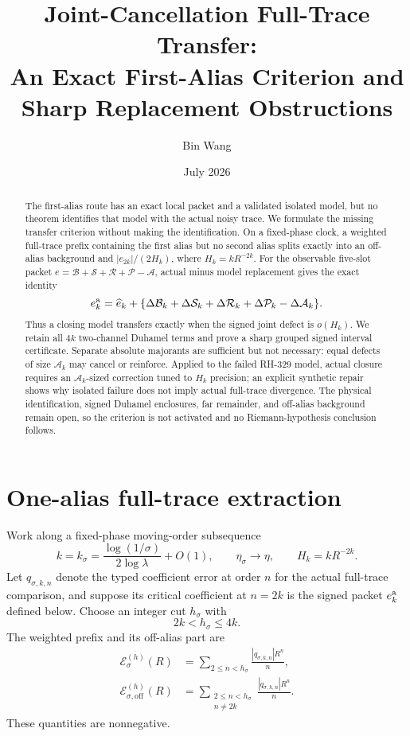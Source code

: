\documentclass[11pt]{article}
\title{Joint-Cancellation Full-Trace Transfer:\\
An Exact First-Alias Criterion and Sharp Replacement Obstructions}
\author{Bin Wang}
\date{July 2026}
\theoremstyle{remark}
\newcommand{\cA}{\mathcal A}
\newcommand{\cB}{\mathcal B}
\newcommand{\cE}{\mathcal E}
\newcommand{\cP}{\mathcal P}
\newcommand{\cR}{\mathcal R}
\newcommand{\cS}{\mathcal S}
\begin{document}
\maketitle

\begin{abstract}
The first-alias route has an exact local packet and a validated isolated
model, but no theorem identifies that model with the actual noisy trace.  We
formulate the missing transfer criterion without making the identification.
On a fixed-phase clock, a weighted full-trace prefix containing the first
alias but no second alias splits exactly into an off-alias background and
$|e_{2k}|/(2H_k)$, where $H_k=kR^{-2k}$.  For the observable five-slot
packet $e=\cB+\cS+\cR+\cP-\cA$, actual minus model replacement gives the
exact identity
\[
 e_k^{\rm a}=\widehat e_k+
 \{\Delta\cB_k+\Delta\cS_k+\Delta\cR_k+
   \Delta\cP_k-\Delta\cA_k\}.
\]
Thus a closing model transfers exactly when the signed joint defect is
$o(H_k)$.  We retain all $4k$ two-channel Duhamel terms and prove a sharp
grouped signed interval certificate.  Separate absolute majorants are
sufficient but not necessary: equal defects of size $\cA_k$ may cancel or
reinforce.  Applied to the failed RH-329 model, actual closure requires an
$\cA_k$-sized correction tuned to $H_k$ precision; an explicit synthetic
repair shows why isolated failure does not imply actual full-trace
divergence.  The physical identification, signed Duhamel enclosures, far
remainder, and off-alias background remain open, so the criterion is not
activated and no Riemann-hypothesis conclusion follows.
\end{abstract}

\section{One-alias full-trace extraction}

Work along a fixed-phase moving-order subsequence
\begin{equation}
 k=k_\sigma
 =\frac{\log(1/\sigma)}{2\log\lambda}+O(1),
 \qquad \eta_\sigma\longrightarrow\eta,
 \qquad H_k=kR^{-2k}.
 \label{eq:clock}
\end{equation}
Let $q_{\sigma,k,n}$ denote the typed coefficient error at order $n$ for
the actual full-trace comparison, and suppose its critical coefficient at
$n=2k$ is the signed packet $e_k^{\rm a}$ defined below.  Choose an integer
cut $h_\sigma$ with
\begin{equation}
 2k<h_\sigma\le4k.
 \label{eq:one-alias-window}
\end{equation}
The weighted prefix and its off-alias part are
\begin{align}
 \cE_\sigma^{(h)}(R)
 &=\sum_{2\le n<h_\sigma}
   \frac{|q_{\sigma,k,n}|R^n}{n},
 \label{eq:weighted-prefix}\\
 \cE_{\sigma,\mathrm{off}}^{(h)}(R)
 &=\sum_{\substack{2\le n<h_\sigma\\n\ne2k}}
   \frac{|q_{\sigma,k,n}|R^n}{n}.
 \label{eq:off-alias}
\end{align}
These quantities are nonnegative.
\end{document}
